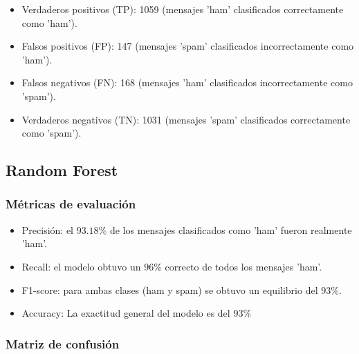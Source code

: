 \begin{itemize}
\item Verdaderos positivos (TP): 1059 (mensajes 'ham' clasificados correctamente como 'ham').
\item Falsos positivos (FP): 147 (mensajes 'spam' clasificados incorrectamente como 'ham').
\item Falsos negativos (FN): 168 (mensajes 'ham' clasificados incorrectamente como 'spam').
\item Verdaderos negativos (TN): 1031 (mensajes 'spam' clasificados correctamente como 'spam').
\end{itemize}
\subsection{Random Forest}

\subsubsection*{Métricas de evaluación}

\begin{itemize}
\item Precisión: el $93.18\%$ de los mensajes clasificados como 'ham' fueron realmente 'ham'.
\item Recall: el modelo obtuvo un $96\%$ correcto de todos los mensajes 'ham'.
\item F1-score: para ambas clases (ham y spam) se obtuvo un equilibrio del $93\%$.
\item Accuracy: La exactitud general del modelo es del $93\%$
\end{itemize}

\subsubsection*{Matriz de confusión}

